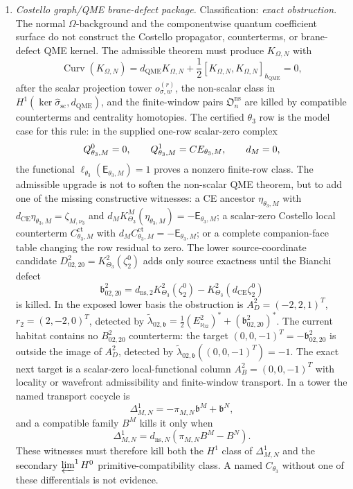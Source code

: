 \begin{enumerate}
  \item \emph{Costello graph/QME brane-defect package.}
  Classification: \emph{exact obstruction}.  The normal
  \(\Omega\)-background and the componentwise quantum coefficient surface
  do not construct the Costello propagator, counterterms, or
  brane-defect QME kernel.  The admissible theorem must produce
  \(K_{\Omega,N}\) with
  \[
    \operatorname{Curv}(K_{\Omega,N})
    =
    d_{\mathrm{QME}}K_{\Omega,N}
    +\frac12[K_{\Omega,N},K_{\Omega,N}]_{\hbar_{\mathrm{QME}}}=0,
  \]
  after the scalar projection tower \(o_{\sigma,w}^{(r)}\), the
  non-scalar class in
  \(H^1(\ker\widehat\sigma_{\mathrm{sc}},d_{\mathrm{QME}})\), and the
  finite-window pairs \(\mathfrak O_n^{\mathrm{ns}}\) are killed by
  compatible counterterms and centrality homotopies.
  The certified \(\theta_3\) row is the model case for this rule:
  in the supplied one-row scalar-zero complex
  \[
    Q^0_{\theta_3,M}=0,\qquad
    Q^1_{\theta_3,M}=CE_{\theta_3,M},\qquad d_M=0,
  \]
  the functional \(\ell_{\theta_3}(\mathsf E_{\theta_3,M})=1\)
  proves a nonzero finite-row class.  The admissible upgrade is not to
  soften the non-scalar QME theorem, but to add one of the missing
  constructive witnesses:
  a CE ancestor \(\eta_{\theta_3,M}\) with
  \(d_{\mathrm{CE}}\eta_{\theta_3,M}=\zeta_{M,\nu_3}\) and
  \(d_MK^M_{\Theta_3}(\eta_{\theta_3,M})=-\mathsf E_{\theta_3,M}\);
  a scalar-zero Costello local counterterm
  \(C^{\mathrm{ct}}_{\theta_3,M}\) with
  \(d_MC^{\mathrm{ct}}_{\theta_3,M}=-\mathsf E_{\theta_3,M}\);
  or a complete companion-face table changing the row residual to zero.
  The lower source-coordinate candidate
  \(D^2_{02,20}=K^2_{\Theta_3}(\zeta^0_2)\) adds only source exactness
  until the Bianchi defect
  \[
    \mathfrak b^2_{02,20}
    =
    d_{\mathrm{ns},2}K^2_{\Theta_3}(\zeta^0_2)
    -
    K^2_{\Theta_3}(d_{\mathrm{CE}}\zeta^0_2)
  \]
  is killed.  In the exposed lower basis the obstruction is
  \(A_D^2=(-2,2,1)^T\), \(r_2=(2,-2,0)^T\), detected by
  \(\widetilde\lambda_{02,\mathfrak b}
  =\frac12(E^2_{\nu_{02}})^*
  +(\mathfrak b^2_{02,20})^*\).  The current habitat contains no
  \(B^2_{02,20}\) counterterm: the target
  \((0,0,-1)^T=-\mathfrak b^2_{02,20}\) is outside the image of
  \(A_D^2\), detected by
  \(\widetilde\lambda_{02,\mathfrak b}((0,0,-1)^T)=-1\).  The exact next
  target is a scalar-zero local-functional column
  \(A_B^2=(0,0,-1)^T\) with locality or wavefront admissibility and
  finite-window transport.  In a tower the named transport cocycle is
  \[
    \Delta^1_{M,N}
    =
    -\pi_{M,N}\mathfrak b^M+\mathfrak b^N,
  \]
  and a compatible family \(B^M\) kills it only when
  \[
    \Delta^1_{M,N}
    =
    d_{\mathrm{ns},N}(\pi_{M,N}B^M-B^N).
  \]
  These witnesses must therefore kill both the \(H^1\) class of
  \(\Delta^1_{M,N}\) and the secondary \(\varprojlim^1H^0\)
  primitive-compatibility class.  A named \(C_{\theta_3}\) without one of
  these differentials is not evidence.


\end{enumerate}

